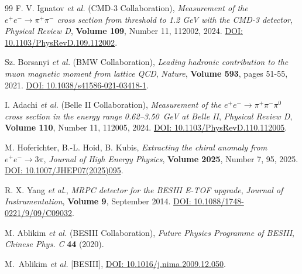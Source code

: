\begin{thebibliography}{99}
    F. V. Ignatov \textit{et al.} (CMD-3 Collaboration),
    \emph{Measurement of the \(e^+e^-\to\pi^+\pi^-\) cross section from threshold to 1.2 GeV with the CMD-3 detector},
    \emph{Physical Review D}, \textbf{Volume 109}, Number 11, 112002, 2024.
    \href{https://doi.org/10.1103/PhysRevD.109.112002}{DOI: 10.1103/PhysRevD.109.112002}.

    Sz. Borsanyi \textit{et al.} (BMW Collaboration),
    \emph{Leading hadronic contribution to the muon magnetic moment from lattice QCD},
    \emph{Nature}, \textbf{Volume 593}, pages 51-55, 2021.
    \href{https://doi.org/10.1038/s41586-021-03418-1}{DOI: 10.1038/s41586-021-03418-1}.

    I. Adachi \textit{et al.} (Belle II Collaboration),
    \emph{Measurement of the \(e^+e^-\to\pi^+\pi^-\pi^0\) cross section in the energy range 0.62--3.50~GeV at Belle II},
    \emph{Physical Review D}, \textbf{Volume 110}, Number 11, 112005, 2024.
    \href{https://doi.org/10.1103/PhysRevD.110.112005}{DOI: 10.1103/PhysRevD.110.112005}.

    M. Hoferichter, B.-L. Hoid, B. Kubis,
    \emph{Extracting the chiral anomaly from \(e^+e^- \to 3\pi\)},
    \emph{Journal of High Energy Physics}, \textbf{Volume 2025}, Number 7, 95, 2025.
    \href{https://doi.org/10.1007/JHEP07(2025)095}{DOI: 10.1007/JHEP07(2025)095}.



    R. X. Yang \textit{et al.},
    \emph{MRPC detector for the BESIII E-TOF upgrade},
    \emph{Journal of Instrumentation}, \textbf{Volume 9}, September 2014.
    \href{https://doi.org/10.1088/1748-0221/9/09/C09032}{DOI: 10.1088/1748-0221/9/09/C09032}.


    M. Ablikim \textit{et al.} (BESIII Collaboration),
    \emph{Future Physics Programme of BESIII},
    \emph{Chinese Phys. C} \textbf{44} (2020).


    M.~Ablikim \textit{et al.} [BESIII],
    \href{https://doi.org/10.1016/j.nima.2009.12.050}{DOI: 10.1016/j.nima.2009.12.050}.


\end{thebibliography}
